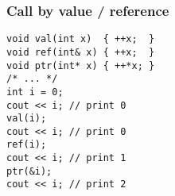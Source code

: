 \begin{frame}[fragile]
    \frametitle{Call by value / reference}
        \begin{lstlisting}
void val(int x)  { ++x;  }
void ref(int& x) { ++x;  }
void ptr(int* x) { ++*x; }
/* ... */
int i = 0;
cout << i; // print 0
val(i);
cout << i; // print 0
ref(i);
cout << i; // print 1
ptr(&i);
cout << i; // print 2
        \end{lstlisting}
\end{frame}



